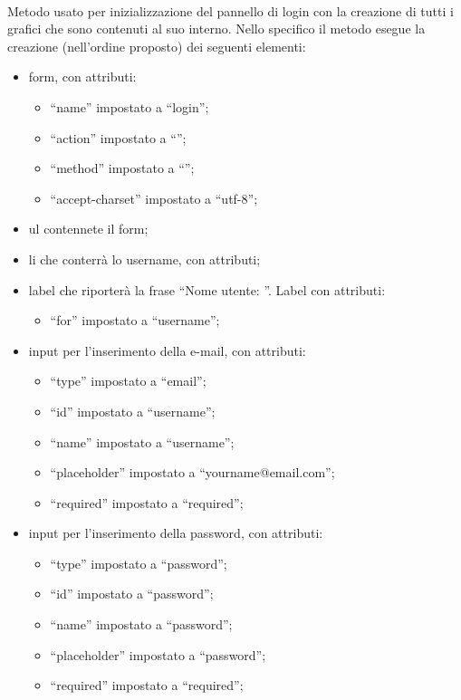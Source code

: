 \begin{description}
	\item{}\\
	Metodo usato per inizializzazione del pannello di login con la creazione di tutti i  grafici che sono contenuti al suo interno. Nello specifico il metodo esegue la creazione (nell'ordine proposto) dei seguenti elementi:
	\begin{itemize}
		\item form, con attributi:
		\begin{itemize}
			\item ``name'' impostato a ``login'';
			\item ``action'' impostato a ``'';
			\item ``method'' impostato a ``'';
			\item ``accept-charset'' impostato a ``utf-8'';				
		\end{itemize}
		\item ul contennete il form;
		\item li che conterrà lo username, con attributi;
		\item label che riporterà la frase ``Nome utente: ''. Label con attributi:
		\begin{itemize}
			\item ``for'' impostato a ``username'';		
		\end{itemize}
		\item input per l'inserimento della e-mail, con attributi:
		\begin{itemize}
			\item ``type'' impostato a ``email'';
			\item ``id'' impostato a ``username'';
			\item ``name'' impostato a ``username'';
			\item ``placeholder'' impostato a ``yourname@email.com'';				\item ``required'' impostato a ``required'';
		\end{itemize}		
		\item input per l'inserimento della password, con attributi:
		\begin{itemize}
			\item ``type'' impostato a ``password'';
			\item ``id'' impostato a ``password'';
			\item ``name'' impostato a ``password'';
			\item ``placeholder'' impostato a ``password'';				\item ``required'' impostato a ``required'';

\end{itemize}
\end{itemize}
\end{description}
